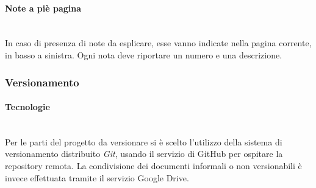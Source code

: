 		\paragraph{Note a piè pagina} \mbox{}\\
		In caso di presenza di note da esplicare, esse vanno indicate nella pagina corrente, in basso a sinistra. Ogni nota deve riportare un numero e una descrizione.
	\subsubsection{Versionamento}
		\paragraph{Tecnologie} \mbox{}\\
		Per le parti del progetto da versionare si è scelto l'utilizzo della sistema di versionamento distribuito \textit{Git}, usando il servizio di GitHub per ospitare la repository remota. La condivisione dei documenti informali o non versionabili è invece effettuata tramite il servizio Google Drive.
